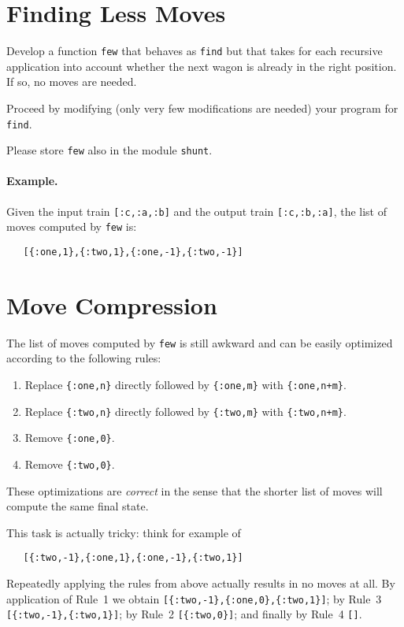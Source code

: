 \documentclass[a4paper,11pt]{article}
\begin{document}
\section{Finding Less Moves}

Develop a function \verb+few+ that behaves as \verb+find+ but
that takes for each recursive application into account whether
the next wagon is already in the right position. If so, no moves
are needed.

Proceed by modifying (only very few modifications are needed)
your program for \verb+find+.

Please store \verb+few+ also in the module \verb+shunt+.

\paragraph{Example.}
Given the input train \verb+[:c,:a,:b]+ and the output train
\verb+[:c,:b,:a]+, the list of moves computed by \verb+few+ is:
\begin{verbatim}
   [{:one,1},{:two,1},{:one,-1},{:two,-1}]
\end{verbatim}


\section{Move Compression}

The list of moves computed by \verb+few+ is still awkward and
can be easily optimized according to the following rules:
\begin{enumerate}
\item Replace \verb+{:one,n}+ directly followed by \verb+{:one,m}+ with
  \verb-{:one,n+m}-.
\item Replace \verb+{:two,n}+ directly followed by \verb+{:two,m}+ with
  \verb-{:two,n+m}-.
\item Remove \verb+{:one,0}+.
\item Remove \verb+{:two,0}+.
\end{enumerate}

These optimizations are \emph{correct} in the sense that the
shorter list of moves will compute the same final state.

This task is actually tricky: think for example of 
\begin{verbatim}
   [{:two,-1},{:one,1},{:one,-1},{:two,1}]
\end{verbatim}
Repeatedly applying the rules from above actually results in no
moves at all. By application of Rule~1 we obtain
\verb+[{:two,-1},{:one,0},{:two,1}]+;
by Rule~3 
\verb+[{:two,-1},{:two,1}]+;
by Rule~2
\verb+[{:two,0}]+;
and finally by Rule~4
\verb+[]+.
\end{document}
